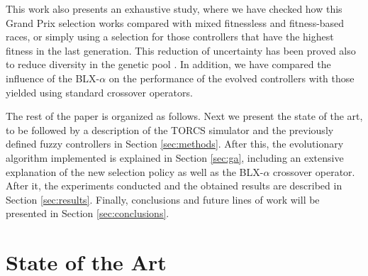 \documentclass[10pt,journal,compsoc]{IEEEtran}
\begin{document}
This work also presents an exhaustive study, where we have checked how this Grand Prix selection works compared with mixed fitnessless and fitness-based races, or simply using a selection for those controllers that have the highest fitness in the last generation.  This reduction of uncertainty has been proved also to reduce diversity in the genetic pool
\cite{DBLP:journals/tcci/MereloLFGCCRMGTCC16}. 
In addition, we have compared the influence of the BLX-$\alpha$ on the performance of the evolved controllers with those yielded using standard crossover operators.



The rest of the paper is organized as follows. Next we present the
state of the art, to be followed by a description of the TORCS
simulator and the previously defined fuzzy controllers in Section
\ref{sec:methods}. After this, the evolutionary algorithm implemented
is explained in Section \ref{sec:ga}, including an extensive explanation of the new selection policy as well as the BLX-$\alpha$ crossover operator. After it, the experiments conducted and the obtained results are described in
Section \ref{sec:results}. Finally, conclusions and future lines of
work will be presented in Section \ref{sec:conclusions}. 


\section{State of the Art}
\label{sec:soa}


\end{document}
